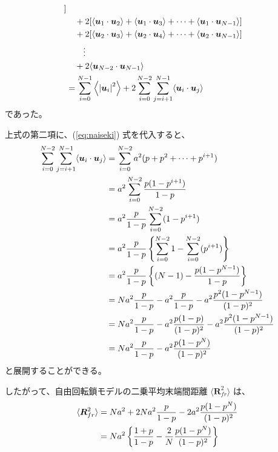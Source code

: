 \documentclass[11pt]{jsarticle}
\begin{document}
\begin{appendix}
\begin{align*}
			] \notag \\
		&\quad+ 
			2[ 
			\langle \bm{u}_1 \cdot \bm{u}_2 \rangle +\langle \bm{u}_1 \cdot \bm{u}_3 \rangle + \cdots + \langle \bm{u}_1 \cdot \bm{u}_{N-1} \rangle 
			] \notag \\
		&\quad+ 
			2[ 
			\langle \bm{u}_2 \cdot \bm{u}_3 \rangle +\langle \bm{u}_2 \cdot \bm{u}_4 \rangle + \cdots + \langle \bm{u}_2 \cdot \bm{u}_{N-1} \rangle 
			] \notag \\
		&\quad\quad \vdots \notag \\
		&\quad+ 
			2\langle \bm{u}_{N-2} \cdot \bm{u}_{N-1} \rangle
			\notag \\
%
%
		&= \sum_{i=0}^{N-1} \left \langle \left| \bm{u}_{i} \right|^2 \right\rangle + 2 \sum_{i=0}^{N-2} \sum_{j=i+1}^{N-1} \langle \bm{u}_i \cdot \bm{u}_j \rangle
\end{align*}
であった。

上式の第二項に、(\ref{eq:naiseki}) 式を代入すると、
\begin{align*}
\sum_{i=0}^{N-2} \sum_{j=i+1}^{N-1} \langle \bm{u}_i \cdot \bm{u}_j \rangle 
	&= \sum_{i=0}^{N-2} a^2 (p + p^2 + \cdots + p^{i+1} ) \notag \\
	&= a^2 \sum_{i=0}^{N-2}  \dfrac{p(1-p^{i+1})}{1-p} \notag \\
	&= a^2 \dfrac{p}{1-p} \sum_{i=0}^{N-2}  (1-p^{i+1}) \notag \\
	&= a^2 \dfrac{p}{1-p} \left \{ \sum_{i=0}^{N-2} 1 - \sum_{i=0}^{N-2} (p^{i+1}) \right \} \notag \\
	&= a^2 \dfrac{p}{1-p} \left\{ (N-1) - \dfrac{p(1-p^{N-1})}{1-p} \right \} \notag \\
	&= Na^2 \dfrac{p}{1-p} - a^2 \dfrac{p}{1-p} - a^2 \dfrac{p^2(1-p^{N-1})}{(1-p)^2} \notag \\
	&= Na^2 \dfrac{p}{1-p} - a^2 \dfrac{p(1-p)}{(1-p)^2} - a^2 \dfrac{p^2(1-p^{N-1})}{(1-p)^2} \notag \\
	&= Na^2 \dfrac{p}{1-p} - a^2 \dfrac{p(1-p^{N})}{(1-p)^2}
\end{align*}
と展開することができる。

したがって、自由回転鎖モデルの二乗平均末端間距離 $\langle \bm{R}_{fr}^2 \rangle$ は、
\begin{align*}
	\langle \bm{R}_{fr}^2 \rangle
		&= N a^2 + 2Na^2 \dfrac{p}{1-p} -2a^2 \dfrac{p(1-p^{N})}{(1-p)^2} \notag \\
		&= N a^2 \left \{ \dfrac{1+p}{1-p} - \dfrac{2}{N} \dfrac{p(1-p^{N})}{(1-p)^2} \right \}
\end{align*}


\end{appendix}
\end{document}

